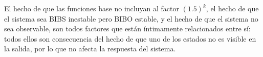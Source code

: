 \documentclass[
  11pt,
  letterpaper,
   addpoints,
  answers
  ]{exam}
\begin{document}
\begin{questions}
\begin{solution}
El hecho de que las funciones base no incluyan al factor $(1.5)^{k}$, el hecho de que el sistema sea BIBS inestable pero BIBO estable, y el hecho de que el sistema no sea observable, son todos factores que están íntimamente relacionados entre sí: todos ellos son consecuencia del hecho de que uno de los estados no es visible en la salida, por lo que no afecta la respuesta del sistema.

\end{solution}

\end{questions}
\end{document}
